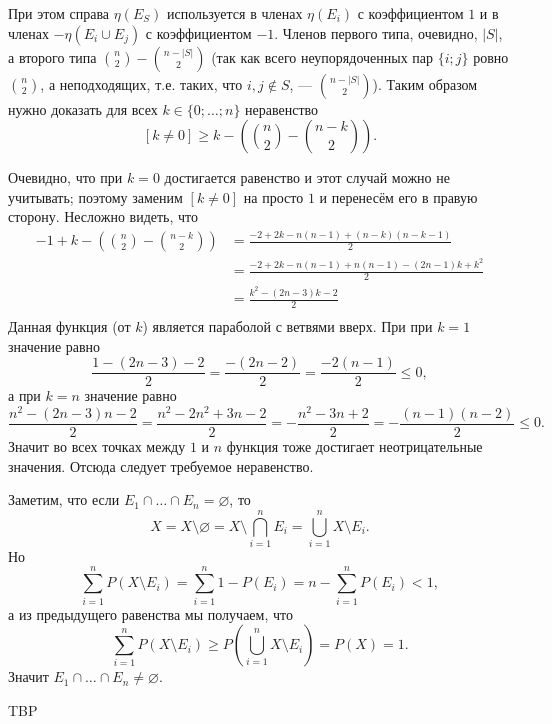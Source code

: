 \documentclass[12pt,a4paper]{article}
\begin{document}
\begin{enumproblem}
        При этом справа $\eta(E_S)$ используется в членах $\eta(E_i)$ с коэффициентом $1$ и в членах $- \eta(E_i \cup E_j)$ с коэффициентом $-1$. Членов первого типа, очевидно, $|S|$, а второго типа $\binom{n}{2} - \binom{n-|S|}{2}$ (так как всего неупорядоченных пар $\{i; j\}$ ровно $\binom{n}{2}$, а неподходящих, т.е. таких, что $i, j \notin S$, --- $\binom{n - |S|}{2}$). Таким образом нужно доказать для всех $k \in \{0; \dots; n\}$ неравенство
        \[[k \neq 0] \geqslant k - \left(\binom{n}{2} - \binom{n-k}{2}\right).\]

        Очевидно, что при $k = 0$ достигается равенство и этот случай можно не учитывать; поэтому заменим $[k \neq 0]$ на просто $1$ и перенесём его в правую сторону. Несложно видеть, что
        \begin{align*}
            - 1 + k - \left(\binom{n}{2} - \binom{n-k}{2}\right)
            &= \frac{-2 + 2k - n(n-1) + (n-k)(n-k-1)}{2}\\
            &= \frac{-2 + 2k - n(n-1) + n(n-1) - (2n-1)k + k^2}{2}\\
            &= \frac{k^2 - (2n-3)k - 2}{2}\\
        \end{align*}
        Данная функция (от $k$) является параболой с ветвями вверх. При при $k = 1$ значение равно
        \[\frac{1 - (2n-3) - 2}{2} = \frac{-(2n-2)}{2} = \frac{-2(n-1)}{2} \leqslant 0,\]
        а при $k = n$ значение равно
        \[\frac{n^2 - (2n-3)n - 2}{2} = \frac{n^2 - 2n^2 + 3n - 2}{2} = -\frac{n^2 - 3n + 2}{2} = -\frac{(n-1)(n-2)}{2} \leqslant 0.\]
        Значит во всех точках между $1$ и $n$ функция тоже достигает неотрицательные значения. Отсюда следует требуемое неравенство.
    \end{enumproblem}

    \begin{enumproblem}
        Заметим, что если $E_1 \cap \dots \cap E_n = \varnothing$, то
        \[X = X \setminus \varnothing = X \setminus \bigcap_{i=1}^n E_i = \bigcup_{i=1}^n X \setminus E_i.\]
        Но
        \[\sum_{i=1}^n P(X \setminus E_i) = \sum_{i=1}^n 1 - P(E_i) = n - \sum_{i=1}^n P(E_i) < 1,\]
        а из предыдущего равенства мы получаем, что
        \[\sum_{i=1}^n P(X \setminus E_i) \geqslant P\left(\bigcup_{i=1}^n X \setminus E_i\right) = P(X) = 1.\]
        Значит $E_1 \cap \dots \cap E_n \neq \varnothing$.
    \end{enumproblem}

    \begin{enumproblem}
        TBP
    \end{enumproblem}
\end{document}
